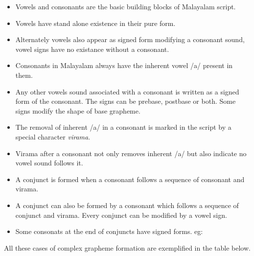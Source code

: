 \documentclass[10pt]{article}
\begin{document}
\begin{itemize}
\item
Vowels and consonants are the basic building blocks of Malayalam script.
\item
 Vowels have stand alone existence in their pure form. 
\item
Alternately vowels also appear as signed form modifying a consonant sound, vowel signs have no existance  without a consonant. 
\item Consonants in Malayalam always have the inherent vowel /a/ present in them.
\item
 Any other vowels sound associated with a consonant is written as a signed form of the consonant. The signs can be prebase, postbase or both. Some signs modify the shape of base grapheme.
\item
The removal of inherent /a/ in a consonant is marked in the script by a special character \textit{virama}. 
\item
Virama after a consonant not only removes inherent /a/ but also indicate no vowel sound follows it. 
\item
A conjunct is formed when a consonant follows a sequence of consonant and virama.
\item
 A conjunct can also be formed by a consonant which follows a sequence of conjunct and virama. Every conjunct can be modified by a vowel sign.  
\item
Some consonats at the end of conjuncts have signed forms. eg: 

\end{itemize}



All these cases of complex grapheme formation are exemplified in the table below.
\newline

\manjari
\end{document}
